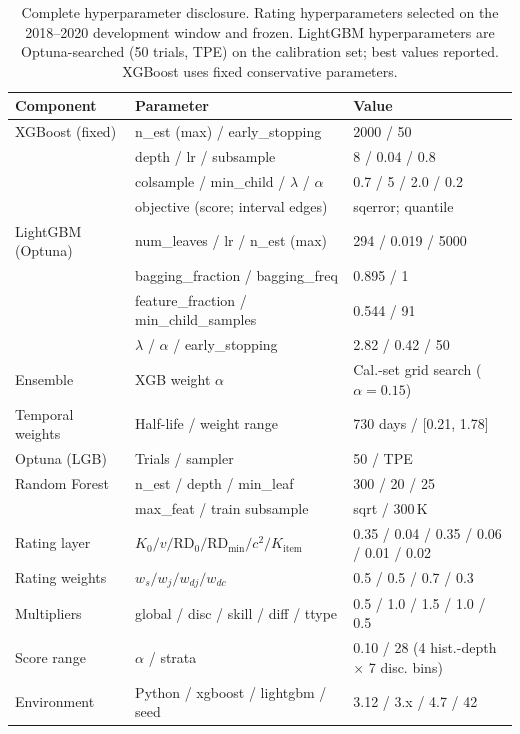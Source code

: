 \documentclass[11pt]{article}
\begin{document}
\begin{table}[ht]
\centering
\caption{Complete hyperparameter disclosure.
Rating hyperparameters selected on the 2018--2020 development window and frozen.
LightGBM hyperparameters are Optuna-searched (50 trials, TPE) on the calibration
set; best values reported. XGBoost uses fixed conservative parameters.}
\label{tab:hyperparams}
\small
\begin{tabular}{@{}lp{5.5cm}l@{}}
\toprule
\textbf{Component} & \textbf{Parameter} & \textbf{Value} \\
\midrule
XGBoost (fixed) & n\_est (max) / early\_stopping & 2000 / 50 \\
 & depth / lr / subsample & 8 / 0.04 / 0.8 \\
 & colsample / min\_child / $\lambda$ / $\alpha$ & 0.7 / 5 / 2.0 / 0.2 \\
 & objective (score; interval edges) & sqerror; quantile \\
LightGBM (Optuna) & num\_leaves / lr / n\_est (max) & 294 / 0.019 / 5000 \\
 & bagging\_fraction / bagging\_freq & 0.895 / 1 \\
 & feature\_fraction / min\_child\_samples & 0.544 / 91 \\
 & $\lambda$ / $\alpha$ / early\_stopping & 2.82 / 0.42 / 50 \\
Ensemble & XGB weight $\alpha$ & Cal.-set grid search ($\alpha=0.15$) \\
Temporal weights & Half-life / weight range & 730 days / [0.21, 1.78] \\
Optuna (LGB) & Trials / sampler & 50 / TPE \\
Random Forest & n\_est / depth / min\_leaf & 300 / 20 / 25 \\
 & max\_feat / train subsample & sqrt / 300\,K \\
Rating layer & $K_0 / v / \mathrm{RD}_0 / \mathrm{RD}_{\min} / c^2 / K_{\text{item}}$ & 0.35 / 0.04 / 0.35 / 0.06 / 0.01 / 0.02 \\
Rating weights & $w_s / w_j / w_{dj} / w_{dc}$ & 0.5 / 0.5 / 0.7 / 0.3 \\
Multipliers & global / disc / skill / diff / ttype & 0.5 / 1.0 / 1.5 / 1.0 / 0.5 \\
Score range & $\alpha$ / strata & 0.10 / 28 (4 hist.-depth $\times$ 7 disc. bins) \\
Environment & Python / xgboost / lightgbm / seed & 3.12 / 3.x / 4.7 / 42 \\
\bottomrule
\end{tabular}
\end{table}
\end{document}
